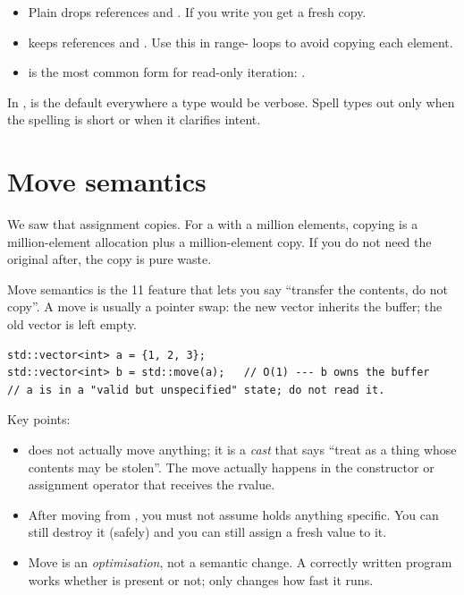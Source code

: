 \begin{itemize}[leftmargin=*]
  \item Plain  drops references and . If you
    write  you get a fresh copy.
  \item {} keeps references and . Use this in
    range- loops to avoid copying each element.
  \item {} is the most common form for read-only
    iteration: .
\end{itemize}

In \maya{},  is the default everywhere a type would be
verbose. Spell types out only when the spelling is short or when it
clarifies intent.

\section{Move semantics}
\label{sec:cpp:move}

We saw that assignment copies. For a  with a
million elements, copying is a million-element allocation plus a
million-element copy. If you do not need the original after, the
copy is pure waste.

Move semantics is the \cpp{}11 feature that lets you say ``transfer
the contents, do not copy''. A move is usually a pointer swap: the
new vector inherits the buffer; the old vector is left empty.

\begin{lstlisting}
std::vector<int> a = {1, 2, 3};
std::vector<int> b = std::move(a);   // O(1) --- b owns the buffer
// a is in a "valid but unspecified" state; do not read it.
\end{lstlisting}

Key points:

\begin{itemize}[leftmargin=*]
  \item {} does not actually move anything; it is a
    \emph{cast} that says ``treat  as a thing whose contents
    may be stolen''. The move actually happens in the constructor
    or assignment operator that receives the rvalue.
  \item After moving from , you must not assume 
    holds anything specific. You can still destroy it (safely) and
    you can still assign a fresh value to it.
  \item Move is an \emph{optimisation}, not a semantic change. A
    correctly written program works whether  is
    present or not;  only changes how fast it runs.
\end{itemize}


